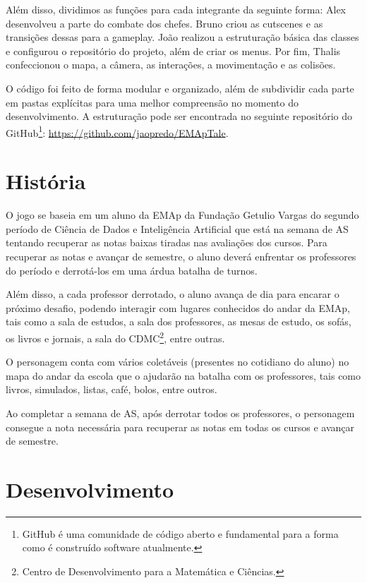 \documentclass[a4paper, 12pt, twoside]{article}
\begin{document}
Além disso, dividimos as funções para cada integrante da seguinte forma: Alex desenvolveu a parte do combate dos chefes. Bruno criou as cutscenes e as transições dessas para a gameplay. João realizou a estruturação básica das classes e configurou o repositório do projeto, além de criar os menus. Por fim, Thalis confeccionou o mapa, a câmera, as interações, a movimentação e as colisões.

O código foi feito de forma modular e organizado, além de subdividir cada parte em pastas explícitas para uma melhor compreensão no momento do desenvolvimento. A estruturação pode ser encontrada no seguinte repositório do GitHub\footnote{GitHub é uma comunidade de código aberto e fundamental para a forma como é construído software atualmente.}: \url{https://github.com/jaopredo/EMApTale}.

\section{História}
O jogo se baseia em um aluno da EMAp da Fundação Getulio Vargas do segundo período de Ciência de Dados e Inteligência Artificial que está na semana de AS tentando recuperar as notas baixas tiradas nas avaliações dos cursos. Para recuperar as notas e avançar de semestre, o aluno deverá enfrentar os professores do período e derrotá-los em uma árdua batalha de turnos.

Além disso, a cada professor derrotado, o aluno avança de dia para encarar o próximo desafio, podendo interagir com lugares conhecidos do andar da EMAp, tais como a sala de estudos, a sala dos professores, as mesas de estudo, os sofás, os livros e jornais, a sala do CDMC\footnote{Centro de Desenvolvimento para a Matemática e Ciências.}, entre outras.

O personagem conta com vários coletáveis (presentes no cotidiano do aluno) no mapa do andar da escola que o ajudarão na batalha com os professores, tais como livros, simulados, listas, café, bolos, entre outros.

Ao completar a semana de AS, após derrotar todos os professores, o personagem consegue a nota necessária para recuperar as notas em todas os cursos e avançar de semestre.

\section{Desenvolvimento}
\end{document}
